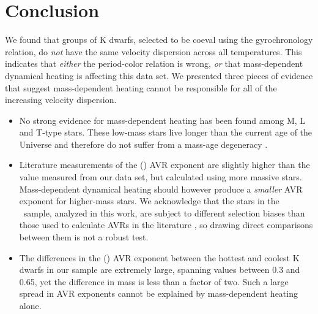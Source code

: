\section{Conclusion}

We found that groups of K dwarfs, selected to be coeval using the
\citet{angus2019} gyrochronology relation, do {\it not} have the same velocity
dispersion across all temperatures.
This indicates that {\it either} the \citep{angus2019} period-color relation
is wrong, {\it or} that mass-dependent dynamical heating is affecting this
data set.
We presented three pieces of evidence that suggest mass-dependent heating
cannot be responsible for all of the increasing velocity dispersion.

\begin{itemize}

\item{No strong evidence for mass-dependent heating has been found among M, L
and T-type stars.
These low-mass stars live longer than the current age of the Universe and
therefore do not suffer from a mass-age degeneracy \citep{faherty2009}.}

\item{Literature measurements of the (\vz) AVR exponent are slightly higher
than the value measured from our data set, but calculated using more massive
stars.
Mass-dependent dynamical heating should however produce a {\it smaller} AVR
exponent for higher-mass stars.
We acknowledge that the stars in the \mct\ sample, analyzed in this work, are
subject to different selection biases than those used to calculate AVRs in the
literature \citep{holmberg2009, aumer2009, yu2018}, so drawing direct
comparisons between them is not a robust test.}

\item{The differences in the (\vb) AVR exponent between the hottest and
coolest K dwarfs in our sample are extremely large, spanning values between
0.3 and 0.65, yet the difference in mass is less than a factor of two.
Such a large spread in AVR exponents cannot be explained by mass-dependent
heating alone.}

\end{itemize}

